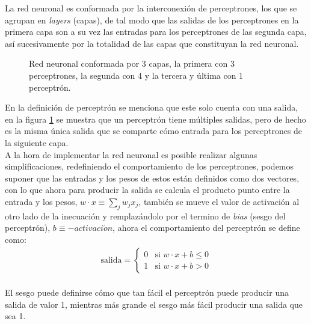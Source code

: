 \documentclass{iccmemoria}
\begin{document}
La red neuronal es conformada por la interconexión de perceptrones, los que se agrupan en \emph{layers} (capas), de tal modo que las salidas de los perceptrones en la primera capa son a su vez las entradas para los perceptrones de las segunda capa, así sucesivamente por la totalidad de las capas que constituyan la red neuronal.\\

\begin{figure}[H]
  \centering
  \begin{large}
  
  \end{large}
  \caption[Representación de una red neuronal.]{Red neuronal conformada por 3 capas, la primera con 3 perceptrones, la segunda con 4 y la tercera y última con 1 perceptrón.}
  \label{fig:red neuronal}
\end{figure}

En la definición de perceptrón se menciona que este solo cuenta con una salida, en la figura \ref{fig:red neuronal} se muestra que un perceptrón tiene múltiples salidas, pero de hecho es la misma única salida que se comparte cómo entrada para los perceptrones de la siguiente capa.\\

A la hora de implementar la red neuronal es posible realizar algunas simplificaciones, redefiniendo el comportamiento de los perceptrones, podemos suponer que las entradas y los pesos de estos están definidos como dos vectores, con lo que ahora para producir la salida se calcula el producto punto entre la entrada y los pesos, $ w \cdot x \equiv \sum_{j}{} w_{j} x_{j} $, también se mueve el valor de activación al otro lado de la inecuación y remplazándolo por el termino de \emph{bias} (sesgo del perceptrón), $ b \equiv -activaci\acute{o}n$, ahora el comportamiento del perceptrón se define como:\\

\begin{equation}
	\begin{split}
		\mbox{salida} = \begin{cases}
			0 & \mbox{si } w\cdot x + b \leq 0 \\
      		1 & \mbox{si } w\cdot x + b > 0
		\end{cases}
	\end{split}
\end{equation}\\

El sesgo puede definirse cómo que tan fácil el perceptrón puede producir una salida de valor 1, mientras más grande el sesgo más fácil producir una salida que sea 1.\\
\end{document}
